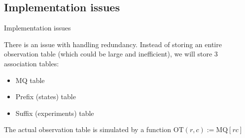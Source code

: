 \documentclass[aspectratio=169,xcolor=dvipsnames]{beamer}
\begin{document}
\subsection{Implementation issues}
\begin{frame}[t]{Implementation issues}


There is an issue with handling redundancy. Instead of storing an entire observation table (which could be large and inefficient), we will store 3 association tables:
\begin{itemize}
    \item MQ table
    \item Prefix (states) table
    \item Suffix (experiments) table
\end{itemize}

\vspace{3mm}

The actual observation table is simulated by a function $\text{OT}(r, c) := \text{MQ}[rc]$

\end{frame}




\end{document}
